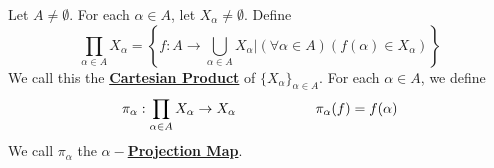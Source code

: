 \newcommand{\InfiniteCartesianProduct}[0]{\textbf{\hyperref[def:InfiniteCartesianProduct]{Cartesian Product}}\xspace}
\newcommand{\InfiniteCartesianProducts}[0]{\textbf{\hyperref[def:InfiniteCartesianProduct]{Cartesian Products}}\xspace}
\newcommand{\scCartesianProduct}[3]{\ensuremath{\prod\limits_{#1 \in #2}#3_{#1}}\xspace}
\newcommand{\ProjectionMap}[0]{\textbf{\hyperref[def:InfiniteCartesianProduct]{Projection Map}}\xspace}
\begin{df}
\label{def:InfiniteCartesianProduct}
\rm
    Let $A \neq \emptyset$. 
    For each $\alpha \in A$, let 
    $X_{\alpha} \neq \emptyset$. 
    Define 
    \begin{equation*}
        \prod\limits_{\alpha \in A} X_{\alpha } = \left\{f:A \to \bigcup\limits_{\alpha \in A} X_{\alpha} | (\forall \alpha \in A)(f(\alpha) \in X_{\alpha} ) \right\}
    \end{equation*}
    We call this the 
    \InfiniteCartesianProduct
    of $\{X_\alpha\}_{\alpha \in A}$. 
    For each $\alpha \in A$, we define 
    \begin{equation*}
        \pi_\alpha : \scCartesianProduct{\alpha}{A}{X} \to X_{\alpha }\tab[2cm] \pi_\alpha(f) = f(\alpha)
    \end{equation*}
    We call $\pi_\alpha$ the
    $\alpha-$\ProjectionMap.
\end{df}
